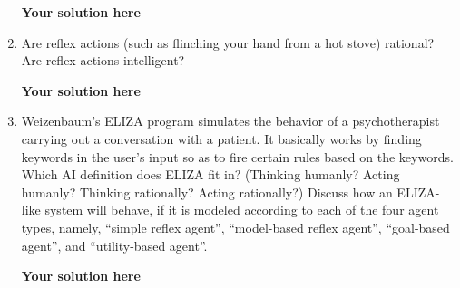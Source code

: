 \documentclass[12pt,letterpaper,pdftex]{report}
\theoremstyle{definition}
\begin{document}
\begin{enumerate}
\begin{solution}
	\textbf{Your solution here}
\end{solution}


\item Are reflex actions (such as flinching your hand from a hot stove)
rational? Are reflex actions intelligent?

\begin{solution}
	\textbf{Your solution here}
\end{solution}


\item Weizenbaum's ELIZA program simulates the behavior of a
psychotherapist carrying out a conversation with a patient. It
basically works by finding keywords in the user's input so as to fire
certain rules based on the keywords. Which AI definition does ELIZA
fit in? (Thinking humanly? Acting humanly? Thinking rationally? Acting
rationally?) Discuss how an ELIZA-like system will behave, if it is
modeled according to each of the four agent types, namely, ``simple
reflex agent'', ``model-based reflex agent'', ``goal-based agent'',
and ``utility-based agent''.

\begin{solution}
	\textbf{Your solution here}
\end{solution}


\end{enumerate}
\end{document}
